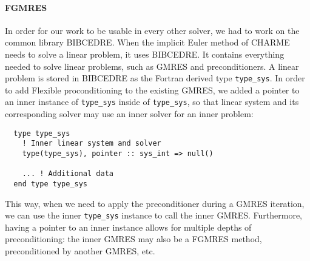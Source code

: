     \paragraph{FGMRES}
    In order for our work to be usable in every other solver, we had to work on the common library BIBCEDRE.
    When the implicit Euler method of CHARME needs to solve a linear problem, it uses BIBCEDRE.
    It contains everything needed to solve linear problems, such as GMRES and preconditioners.
    A linear problem is stored in BIBCEDRE as the Fortran derived type \texttt{type_sys}.
    In order to add Flexible proconditioning to the existing GMRES, we added a pointer to an inner instance of \texttt{type_sys} inside of \texttt{type_sys}, so that linear system and its corresponding solver may use an inner solver for an inner problem:
\begin{verbatim}
  type type_sys
    ! Inner linear system and solver
    type(type_sys), pointer :: sys_int => null()

    ... ! Additional data
  end type type_sys
\end{verbatim}
    This way, when we need to apply the preconditioner during a GMRES iteration, we can use the inner \texttt{type_sys} instance to call the inner GMRES.
    Furthermore, having a pointer to an inner instance allows for multiple depths of preconditioning: the inner GMRES may also be a FGMRES method, preconditioned by another GMRES, etc.


